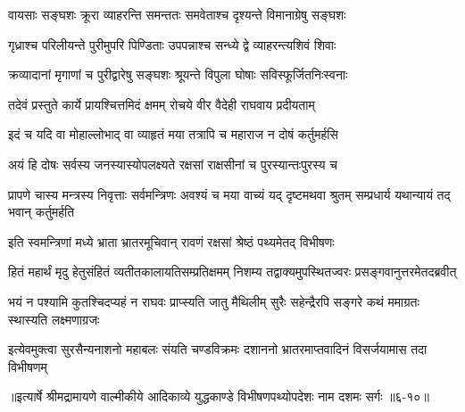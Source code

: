 \twolineshloka
{वायसाः सङ्घशः क्रूरा व्याहरन्ति समन्ततः}
{समवेताश्च दृश्यन्ते विमानाग्रेषु सङ्घशः} %

\twolineshloka
{गृध्राश्च परिलीयन्ते पुरीमुपरि पिण्डिताः}
{उपपन्नाश्च सन्ध्ये द्वे व्याहरन्त्यशिवं शिवाः} %

\twolineshloka
{क्रव्यादानां मृगाणां च पुरीद्वारेषु सङ्घशः}
{श्रूयन्ते विपुला घोषाः सविस्फूर्जितनिःस्वनाः} %

\twolineshloka
{तदेवं प्रस्तुते कार्ये प्रायश्चित्तमिदं क्षमम्}
{रोचये वीर वैदेही राघवाय प्रदीयताम्} %

\twolineshloka
{इदं च यदि वा मोहाल्लोभाद् वा व्याहृतं मया}
{तत्रापि च महाराज न दोषं कर्तुमर्हसि} %

\twolineshloka
{अयं हि दोषः सर्वस्य जनस्यास्योपलक्ष्यते}
{रक्षसां राक्षसीनां च पुरस्यान्तःपुरस्य च} %

\threelineshloka
{प्रापणे चास्य मन्त्रस्य निवृत्ताः सर्वमन्त्रिणः}
{अवश्यं च मया वाच्यं यद् दृष्टमथवा श्रुतम्}
{सम्प्रधार्य यथान्यायं तद् भवान् कर्तुमर्हति} %

\twolineshloka
{इति स्वमन्त्रिणां मध्ये भ्राता भ्रातरमूचिवान्}
{रावणं रक्षसां श्रेष्ठं पथ्यमेतद् विभीषणः} %

\twolineshloka
{हितं महार्थं मृदु हेतुसंहितं व्यतीतकालायतिसम्प्रतिक्षमम्}
{निशम्य तद्वाक्यमुपस्थितज्वरः प्रसङ्गवानुत्तरमेतदब्रवीत्} %

\twolineshloka
{भयं न पश्यामि कुतश्चिदप्यहं न राघवः प्राप्स्यति जातु मैथिलीम्}
{सुरैः सहेन्द्रैरपि सङ्गरे कथं ममाग्रतः स्थास्यति लक्ष्मणाग्रजः} %

\twolineshloka
{इत्येवमुक्त्वा सुरसैन्यनाशनो महाबलः संयति चण्डविक्रमः}
{दशाननो भ्रातरमाप्तवादिनं विसर्जयामास तदा विभीषणम्} %


॥इत्यार्षे श्रीमद्रामायणे वाल्मीकीये आदिकाव्ये युद्धकाण्डे विभीषणपथ्योपदेशः नाम दशमः सर्गः ॥६-१०॥
